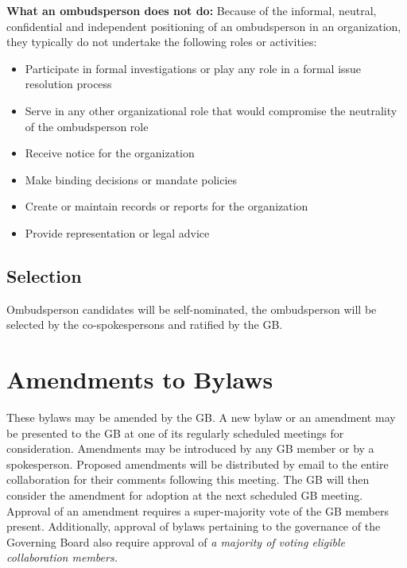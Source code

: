 \documentclass[12pt]{article}
\begin{document}
{\bf What an ombudsperson does not do:} Because of the informal, neutral, confidential and independent positioning of an ombudsperson
in an organization, they typically do not undertake the following roles or activities:
\begin{itemize}
\item Participate in formal investigations or play any role in a formal issue resolution process
\item Serve in any other organizational role that would compromise the neutrality of the
ombudsperson role
\item Receive notice for the organization
\item Make binding decisions or mandate policies
\item Create or maintain records or reports for the organization
\item Provide representation or legal advice

\end{itemize}

\subsection{Selection}
Ombudsperson candidates will be self-nominated, the ombudsperson will be selected by the co-spokespersons and ratified by the GB.

\section{Amendments to Bylaws}
\label{sec:amend}

These bylaws may be amended by the GB. A new bylaw or an amendment may be presented to the GB at one of its regularly scheduled meetings for consideration. Amendments may be introduced by any GB member or by a spokesperson. Proposed amendments will be distributed by email to the entire collaboration for their comments following this meeting. The GB will then consider the amendment for adoption at the next scheduled GB meeting. Approval of an amendment requires a super-majority vote of the GB members present. Additionally, approval of bylaws pertaining to the governance of the Governing Board also require approval of  {\it a majority of voting eligible collaboration members.}
\end{document}
